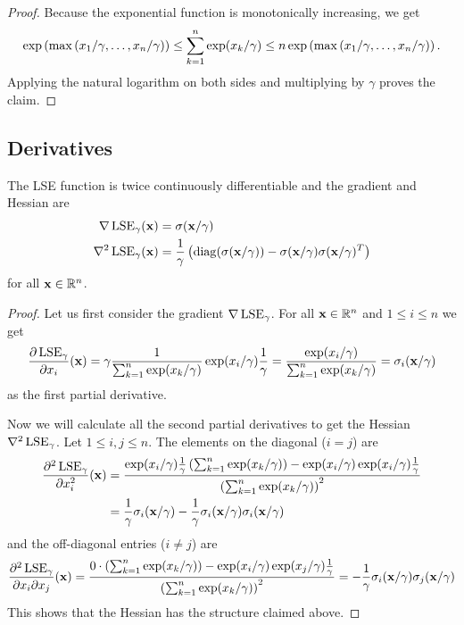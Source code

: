 \begin{proof}
 Because the exponential function is monotonically increasing, we get
 \[ \exp \left({ \max \left({x_1/\gamma, \ldots, x_n/\gamma}\right) }\right) \leq \sum_{k = 1}^n \exp(x_k/\gamma) \leq n \exp \left({ \max \left({x_1/\gamma, \ldots, x_n/\gamma}\right) }\right).\]
 Applying the natural logarithm on both sides and multiplying by \(\gamma\) proves the claim.
\end{proof}



\subsection{Derivatives} \label{sec:LSE_derivatives}

\begin{theorem} \label{thm:LSE_derivatives}
 The LSE function is twice continuously differentiable and the gradient and Hessian are
 \begin{align*}
  \nabla \operatorname{LSE}_\gamma (\mathbf{x})   &= \sigma(\mathbf{x}/\gamma) \\
  \nabla^2 \operatorname{LSE}_\gamma (\mathbf{x}) &= \frac{1}{\gamma} \left({\operatorname{diag}(\sigma(\mathbf{x}/\gamma)) - \sigma(\mathbf{x}/\gamma) \sigma(\mathbf{x}/\gamma)^T}\right)
 \end{align*}
 for all \(\mathbf{x} \in \mathbb{R}^n\).
\end{theorem}

\begin{proof}
 Let us first consider the gradient \(\nabla \operatorname{LSE}_\gamma\). For all \(\mathbf{x} \in \mathbb{R}^n \) and \(1 \leq i \leq n\) we get
 \[ \frac{\partial \operatorname{LSE}_\gamma}{\partial x_i} (\mathbf{x}) = \gamma \frac{1}{\sum_{k = 1}^n \exp(x_k/\gamma)} \exp(x_i/\gamma) \frac{1}{\gamma} = \frac{\exp(x_i/\gamma)}{\sum_{k = 1}^n \exp(x_k/\gamma)} = \sigma_i(\mathbf{x}/\gamma)\]
 as the first partial derivative.
 
 Now we will calculate all the second partial derivatives to get the Hessian \(\nabla^2 \operatorname{LSE}_\gamma\). 
 Let \(1 \leq i, j \leq n\). The elements on the diagonal (\(i = j\)) are
 \begin{align*}
  \frac{\partial^2 \operatorname{LSE}_\gamma}{\partial x_i^2} (\mathbf{x}) &= \frac{\exp(x_i/\gamma) \frac{1}{\gamma} \left({ \sum_{k = 1}^n \exp(x_k/\gamma) }\right) - \exp(x_i/\gamma) \exp(x_i/\gamma) \frac{1}{\gamma}}{ \left({ \sum_{k = 1}^n \exp(x_k/\gamma) }\right)^2 } \\
                                                      &= \frac{1}{\gamma} \sigma_i(\mathbf{x}/\gamma) - \frac{1}{\gamma} \sigma_i(\mathbf{x}/\gamma) \sigma_i(\mathbf{x}/\gamma)
 \end{align*}
 and the off-diagonal entries (\(i \neq j\)) are
 \[ \frac{\partial^2 \operatorname{LSE}_\gamma}{\partial x_i \partial x_j} (\mathbf{x}) = \frac{0 \cdot \left({ \sum_{k = 1}^n \exp(x_k/\gamma) }\right) - \exp(x_i/\gamma) \exp(x_j/\gamma) \frac{1}{\gamma}}{ \left({ \sum_{k = 1}^n \exp(x_k/\gamma) }\right)^2 } = - \frac{1}{\gamma} \sigma_i(\mathbf{x}/\gamma) \sigma_j(\mathbf{x}/\gamma)\]
 This shows that the Hessian has the structure claimed above.
\end{proof}



